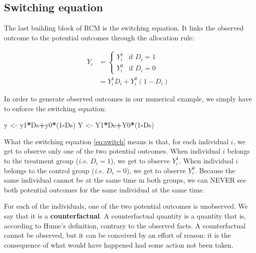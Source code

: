 \documentclass[]{book}
\newenvironment{Shaded}{\begin{snugshade}}{\end{snugshade}}
\newcommand{\DecValTok}[1]{\textcolor[rgb]{0.00,0.00,0.81}{#1}}
\newcommand{\StringTok}[1]{\textcolor[rgb]{0.31,0.60,0.02}{#1}}
\newcommand{\OperatorTok}[1]{\textcolor[rgb]{0.81,0.36,0.00}{\textbf{#1}}}
\newcommand{\NormalTok}[1]{#1}
\theoremstyle{definition}
\theoremstyle{definition}
\theoremstyle{definition}
\theoremstyle{remark}
\let\BeginKnitrBlock\begin \let\EndKnitrBlock\end
\begin{document}
\subsection{Switching equation}\label{switching-equation}

The last building block of RCM is the switching equation. It links the
observed outcome to the potential outcomes through the allocation rule:

\begin{align}
 \label{eq:switch}
  Y_i & = 
    \begin{cases}
    Y_i^1 & \text{if } D_i=1\\
    Y_i^0 & \text{if } D_i=0
    \end{cases} \\
    & = Y_i^1D_i + Y_i^0(1-D_i) \nonumber
\end{align}

\BeginKnitrBlock{example}
\protect\hypertarget{exm:unnamed-chunk-4}{}{\label{exm:unnamed-chunk-4} }In
order to generate observed outcomes in our numerical example, we simply
have to enforce the switching equation:
\EndKnitrBlock{example}

\begin{Shaded}
\begin{Highlighting}[]
\NormalTok{y <-}\StringTok{ }\NormalTok{y1}\OperatorTok{*}\NormalTok{Ds}\OperatorTok{+}\NormalTok{y0}\OperatorTok{*}\NormalTok{(}\DecValTok{1}\OperatorTok{-}\NormalTok{Ds)}
\NormalTok{Y <-}\StringTok{ }\NormalTok{Y1}\OperatorTok{*}\NormalTok{Ds}\OperatorTok{+}\NormalTok{Y0}\OperatorTok{*}\NormalTok{(}\DecValTok{1}\OperatorTok{-}\NormalTok{Ds)}
\end{Highlighting}
\end{Shaded}

What the switching equation \eqref{eq:switch} means is that, for each
individual \(i\), we get to observe only one of the two potential
outcomes. When individual \(i\) belongs to the treatment group
(\emph{i.e.} \(D_i=1\)), we get to observe \(Y_i^1\). When individual
\(i\) belongs to the control group (\emph{i.e.} \(D_i=0\)), we get to
observe \(Y_i^0\). Because the same individual cannot be at the same
time in both groups, we can NEVER see both potential outcomes for the
same individual at the same time.

For each of the individuals, one of the two potential outcomes is
unobserved. We say that it is a \textbf{counterfactual}. A
counterfactual quantity is a quantity that is, according to Hume's
definition, contrary to the observed facts. A counterfactual cannot be
observed, but it can be conceived by an effort of reason: it is the
consequence of what would have happened had some action not been taken.
\end{document}
